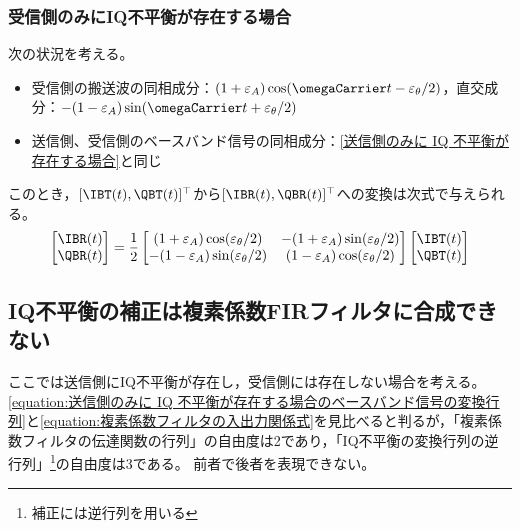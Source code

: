             \subsubsection{受信側のみにIQ不平衡が存在する場合}
                \label{受信側のみに IQ 不平衡が存在する場合}
                次の状況を考える。
                \begin{itemize}
                    \item 受信側の搬送波の同相成分：$(1+\varepsilon_A)\cos(\omegaCarrier t - \varepsilon_\theta/2)$，直交成分：$-(1-\varepsilon_A)\sin(\omegaCarrier t + \varepsilon_\theta/2)$
                    \item 送信側、受信側のベースバンド信号の同相成分：\ref{送信側のみに IQ 不平衡が存在する場合}と同じ
                \end{itemize}
                このとき，$[\IBT(t), \QBT(t)]^\top$から$[\IBR(t), \QBR(t)]^\top$への変換は次式で与えられる。
                \[
                    \begin{bmatrix}
                        \IBR(t) \\
                        \QBR(t)
                    \end{bmatrix} = \frac{1}{2}\begin{bmatrix}
                        (1+\varepsilon_A)\cos(\varepsilon_\theta/2) & -(1+\varepsilon_A)\sin(\varepsilon_\theta/2) \\
                        -(1-\varepsilon_A)\sin(\varepsilon_\theta/2) & (1-\varepsilon_A)\cos(\varepsilon_\theta/2)
                    \end{bmatrix}\begin{bmatrix}
                        \IBT(t) \\
                        \QBT(t)
                    \end{bmatrix}
                \]
        \subsection{IQ不平衡の補正は複素係数FIRフィルタに合成できない}
            ここでは送信側にIQ不平衡が存在し，受信側には存在しない場合を考える。
            \cref{equation:送信側のみに IQ 不平衡が存在する場合のベースバンド信号の変換行列}と\cref{equation:複素係数フィルタの入出力関係式}を見比べると判るが，「複素係数フィルタの伝達関数の行列」の自由度は2であり，「IQ不平衡の変換行列の逆行列」\footnote{補正には逆行列を用いる}の自由度は3である。
            前者で後者を表現できない。
